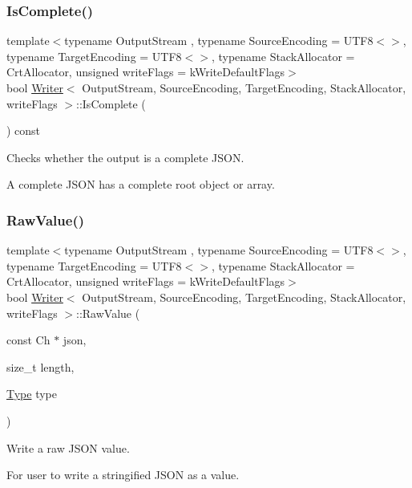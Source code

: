 \subsubsection{\texorpdfstring{Is\+Complete()}{IsComplete()}}
{\footnotesize\ttfamily template$<$typename Output\+Stream , typename Source\+Encoding  = U\+T\+F8$<$$>$, typename Target\+Encoding  = U\+T\+F8$<$$>$, typename Stack\+Allocator  = Crt\+Allocator, unsigned write\+Flags = k\+Write\+Default\+Flags$>$ \\
bool \hyperlink{class_writer}{Writer}$<$ Output\+Stream, Source\+Encoding, Target\+Encoding, Stack\+Allocator, write\+Flags $>$\+::Is\+Complete (\begin{DoxyParamCaption}{ }\end{DoxyParamCaption}) const\hspace{0.3cm}{\ttfamily [inline]}}



Checks whether the output is a complete J\+S\+ON. 

A complete J\+S\+ON has a complete root object or array. \mbox{\label{class_writer_ae0d1615104e4e88040b9640e6784008a}} 
\subsubsection{\texorpdfstring{Raw\+Value()}{RawValue()}}
{\footnotesize\ttfamily template$<$typename Output\+Stream , typename Source\+Encoding  = U\+T\+F8$<$$>$, typename Target\+Encoding  = U\+T\+F8$<$$>$, typename Stack\+Allocator  = Crt\+Allocator, unsigned write\+Flags = k\+Write\+Default\+Flags$>$ \\
bool \hyperlink{class_writer}{Writer}$<$ Output\+Stream, Source\+Encoding, Target\+Encoding, Stack\+Allocator, write\+Flags $>$\+::Raw\+Value (\begin{DoxyParamCaption}\item[{const Ch $\ast$}]{json,  }\item[{size\+\_\+t}]{length,  }\item[{\hyperlink{rapidjson_8h_a1d1cfd8ffb84e947f82999c682b666a7}{Type}}]{type }\end{DoxyParamCaption})\hspace{0.3cm}{\ttfamily [inline]}}



Write a raw J\+S\+ON value. 

For user to write a stringified J\+S\+ON as a value.



